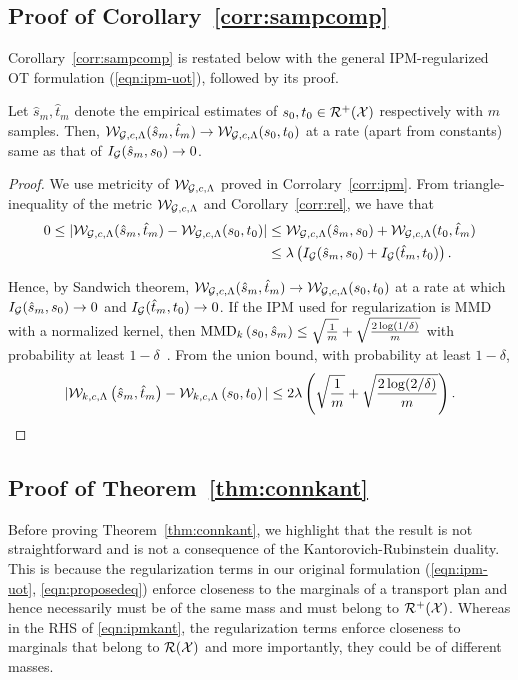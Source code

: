 \subsection[Proof of our Sample Complexity Result]{Proof of Corollary~\ref{corr:sampcomp}}\label{proof:corr-sc}
Corollary~\ref{corr:sampcomp} is restated below with the general IPM-regularized OT formulation (\ref{eqn:ipm-uot}), followed by its proof.
\begin{corollaryBox}
\begin{corollary}
\label{app-corr:sampcomp}
Let $\hat{s}_m,\hat{t}_m$ denote the empirical estimates of $s_0,t_0 \in\mathcal{R}^+(\mathcal{X})$ respectively with $m$ samples. Then, $\mathcal{W}_{\mathcal{G}, c, \Lambda}(\hat{s}_m,\hat{t}_m)\rightarrow\mathcal{W}_{\mathcal{G}, c, \Lambda}(s_0,t_0)$ at a rate (apart from constants)  same as that of $ I_{\mathcal{G}}(\hat{s}_m,s_0)\rightarrow0$. 
\end{corollary}
\end{corollaryBox}
\begin{proof} 
    We use metricity of $\mathcal{W}_{\mathcal{G}, c, \Lambda}$ proved in Corrolary~\ref{corr:ipm}. From triangle-inequality of the metric $\mathcal{W}_{\mathcal{G}, c, \Lambda}$ and Corollary~\ref{corr:rel}, we have that
    \begin{align*}
    0\leq|\mathcal{W}_{\mathcal{G}, c, \Lambda}(\hat{s}_m, \hat{t}_m)-\mathcal{W}_{\mathcal{G}, c, \Lambda}(s_0, t_0)|&\leq \mathcal{W}_{\mathcal{G}, c, \Lambda}(\hat{s}_m, s_0)+\mathcal{W}_{\mathcal{G}, c, \Lambda}(t_0, \hat{t}_m)\\
    &\leq \lambda \left(I_{\mathcal{G}}(\hat{s}_m, s_0)
    + I_{\mathcal{G}}(\hat{t}_m, t_0)\right).
    \end{align*}
    
    Hence, by Sandwich theorem, $\mathcal{W}_{\mathcal{G}, c, \Lambda}(\hat{s}_m, \hat{t}_m)\rightarrow \mathcal{W}_{\mathcal{G}, c, \Lambda}(s_0, t_0)$ at a rate at which $ I_{\mathcal{G}}(\hat{s}_m, s_0)\rightarrow 0$ and $ I_{\mathcal{G}}(\hat{t}_m, t_0)\rightarrow 0$. If the IPM used for regularization is MMD with a normalized kernel, then $\textup{MMD}_k\left(s_0,\hat{s}_m\right)\le \sqrt{\frac{1}{m}}+\sqrt{\frac{2\log(1/\delta)}{m}}$ with probability at least $1-\delta$~\citep{SmolaGSS07}. From the union bound, with probability at least $1-\delta$, $$|\mathcal{W}_{k, c, \Lambda}\left(\hat{s}_m,\hat{t}_m\right)-\mathcal{W}_{k, c, \Lambda}\left(s_0,t_0\right)|\le 2\lambda\left(\sqrt{\frac{1}{m}}+\sqrt{\frac{2\log(2/\delta)}{m}}\right).$$
\end{proof}

\subsection[Proof of our Generalized Kantorovich Duality Result]{Proof of Theorem~\ref{thm:connkant}}\label{app:conn}
Before proving Theorem~\ref{thm:connkant}, we highlight that the result is not straightforward and is not a consequence of the Kantorovich-Rubinstein duality. This is because the regularization terms in our original formulation (\ref{eqn:ipm-uot}, \ref{eqn:proposedeq}) enforce closeness to the marginals of a transport plan and hence necessarily must be of the same mass and must belong to $\mathcal{R}^+(\mathcal{X})$. Whereas in the RHS of \ref{eqn:ipmkant}, the regularization terms enforce closeness to marginals that belong to $\mathcal{R}(\mathcal{X})$ and more importantly, they could be of different masses.

